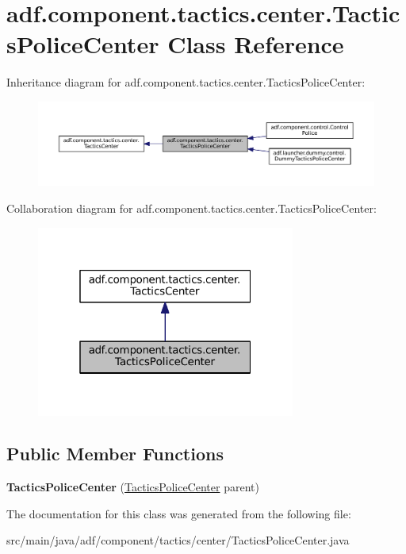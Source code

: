 \hypertarget{classadf_1_1component_1_1tactics_1_1center_1_1TacticsPoliceCenter}{}\section{adf.\+component.\+tactics.\+center.\+Tactics\+Police\+Center Class Reference}
\label{classadf_1_1component_1_1tactics_1_1center_1_1TacticsPoliceCenter}


Inheritance diagram for adf.\+component.\+tactics.\+center.\+Tactics\+Police\+Center\+:
\nopagebreak
\begin{figure}[H]
\begin{center}
\leavevmode
\includegraphics[width=350pt]{classadf_1_1component_1_1tactics_1_1center_1_1TacticsPoliceCenter__inherit__graph}
\end{center}
\end{figure}


Collaboration diagram for adf.\+component.\+tactics.\+center.\+Tactics\+Police\+Center\+:
\nopagebreak
\begin{figure}[H]
\begin{center}
\leavevmode
\includegraphics[width=241pt]{classadf_1_1component_1_1tactics_1_1center_1_1TacticsPoliceCenter__coll__graph}
\end{center}
\end{figure}
\subsection*{Public Member Functions}
\begin{DoxyCompactItemize}
\item 
\hypertarget{classadf_1_1component_1_1tactics_1_1center_1_1TacticsPoliceCenter_a09213a4445d7dd3d5484c558e7e8b2a3}{}\label{classadf_1_1component_1_1tactics_1_1center_1_1TacticsPoliceCenter_a09213a4445d7dd3d5484c558e7e8b2a3} 
{\bfseries Tactics\+Police\+Center} (\hyperlink{classadf_1_1component_1_1tactics_1_1center_1_1TacticsPoliceCenter}{Tactics\+Police\+Center} parent)
\end{DoxyCompactItemize}


The documentation for this class was generated from the following file\+:\begin{DoxyCompactItemize}
\item 
src/main/java/adf/component/tactics/center/Tactics\+Police\+Center.\+java\end{DoxyCompactItemize}
